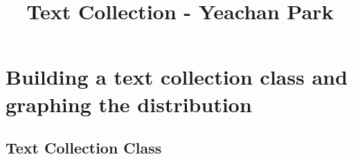 \documentclass[11pt]{article}
\title{Text Collection - Yeachan Park}
\begin{document}
    
    
    \maketitle
    
    

    
    \section{Building a text collection class and graphing the
distribution}\label{building-a-text-collection-class-and-graphing-the-distribution}

    \subsection{Text Collection Class}\label{text-collection-class}
\end{document}
